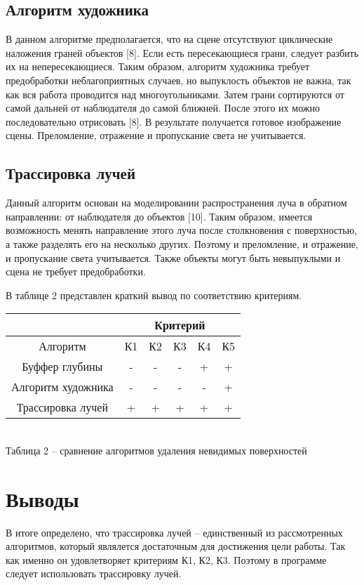 {    \subsection{Алгоритм художника} {
        В данном алгоритме предполагается, что на сцене отсутствуют циклические
        наложения граней объектов [8].
        Если есть пересекающиеся грани, следует разбить их на непересекающиеся.
        Таким образом, алгоритм художника требует предобработки неблагоприятных
        случаев, но выпуклость объектов не важна,
        так как вся работа проводится над многоугольниками.
        Затем грани сортируются от самой дальней от наблюдателя до самой ближней.
        После этого их можно последовательно отрисовать [8].
        В результате получается готовое изображение сцены.
        Преломление, отражение и пропускание света не учитывается.
    }

    \subsection{Трассировка лучей} {
        Данный алгоритм основан на моделировании распространения луча в
        обратном направлении: от наблюдателя до объектов [10].
        Таким образом, имеется возможность менять направление этого луча
        после столкновения с поверхностью, а также разделять его на несколько других.
        Поэтому и преломление, и отражение, и пропускание света учитывается.
        Также объекты могут быть невыпуклыми и сцена не требует предобработки.
    }
    
    В таблице 2 представлен краткий вывод по соответствию критериям.
    
    \begin{center}
        \begin{tabular} { |c|c|c|c|c|c| }
            \hline
            \hspace{0pt} & \multicolumn{5}{|c|}{Критерий} \\
            \hline
            Алгоритм & К1 & К2 & К3 & К4 & К5 \\
            \hline
            Буффер глубины & - & - & - & + & + \\
            \hline
            Алгоритм художника & - & - & - & - & +  \\
            \hline
            Трассировка лучей & + & + & + & + & + \\
            \hline
        \end{tabular}
        \\
        \vspace{2mm}
        \small {
            Таблица 2 -- сравнение алгоритмов удаления невидимых поверхностей
        }
    \end{center}

    \section*{Выводы} {
        В итоге определено, что трассировка лучей -- единственный из
        рассмотренных алгоритмов, который являлется достаточным для достижения
        цели работы.
        Так как именно он удовлетворяет критериям К1, К2, К3.
        Поэтому в программе следует использовать трассировку лучей.
    }
}